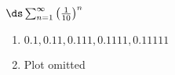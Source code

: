 {$\ds \sum_{n=1}^\infty \left(\frac{1}{10}\right)^n$
}
{\begin{enumerate}
\item	$0.1,0.11,0.111,0.1111,0.11111$
\item	Plot omitted
\end{enumerate}
}
